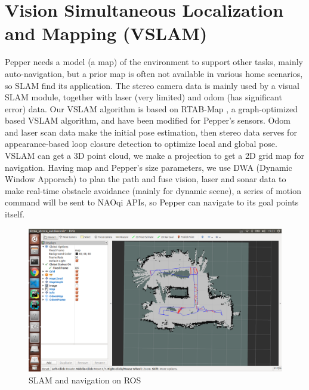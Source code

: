 \section{Vision Simultaneous Localization and Mapping (VSLAM)}
\label{sec:vslam}

Pepper needs a model (a map) of the environment to support other tasks, mainly auto-navigation, but a prior map is often not available in various home scenarios, so SLAM find its application. 
The stereo camera data is mainly used by a visual SLAM module, together with laser (very limited) and odom (has significant error) data. 
Our VSLAM algorithm is based on RTAB-Map \cite{closuredetection,rtabmap}, a graph-optimized based VSLAM algorithm, and have been modified for Pepper's sensors. 
Odom and laser scan data make the initial pose estimation, then stereo data serves for appearance-based loop closure detection to optimize local and global pose. 
VSLAM can get a 3D point cloud, we make a projection to get a 2D grid map for navigation. 
Having map and Pepper’s size parameters, we use DWA (Dynamic Window Apporach) to plan the path and fuse vision, laser and sonar data to make real-time obstacle avoidance (mainly for dynamic scene), a series of motion command will be sent to NAOqi APIs, so Pepper can navigate to its goal points itself.

\begin{figure}[h]
    \centering
    \includegraphics[width=1.\textwidth]{figs/vslam_shortcut.png}
    \caption{SLAM and navigation on ROS}
    \label{fig:vslam}
\end{figure}
